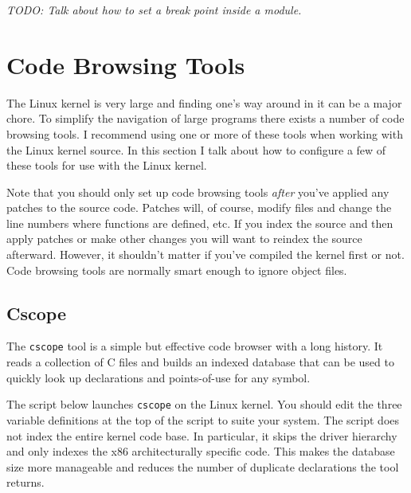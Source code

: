 \documentclass{article}
\newcommand{\command}[1]{\texttt{#1}}
\newcommand{\todo}[1]{\textit{TODO: #1}}
\begin{document}
\todo{Talk about how to set a break point inside a module.}

\section{Code Browsing Tools}
\label{sec:code-browsing}

The Linux kernel is very large and finding one's way around in it can be a major chore. To
simplify the navigation of large programs there exists a number of code browsing tools. I
recommend using one or more of these tools when working with the Linux kernel source. In this
section I talk about how to configure a few of these tools for use with the Linux kernel.

Note that you should only set up code browsing tools \emph{after} you've applied any patches to
the source code. Patches will, of course, modify files and change the line numbers where
functions are defined, etc. If you index the source and then apply patches or make other changes
you will want to reindex the source afterward. However, it shouldn't matter if you've compiled
the kernel first or not. Code browsing tools are normally smart enough to ignore object files.

\subsection{Cscope}

The \command{cscope} tool is a simple but effective code browser with a long history. It reads a
collection of C files and builds an indexed database that can be used to quickly look up
declarations and points-of-use for any symbol.

The script below launches \command{cscope} on the Linux kernel. You should edit the three
variable definitions at the top of the script to suite your system. The script does not index
the entire kernel code base. In particular, it skips the driver hierarchy and only indexes the
x86 architecturally specific code. This makes the database size more manageable and reduces the
number of duplicate declarations the tool returns.
\end{document}
